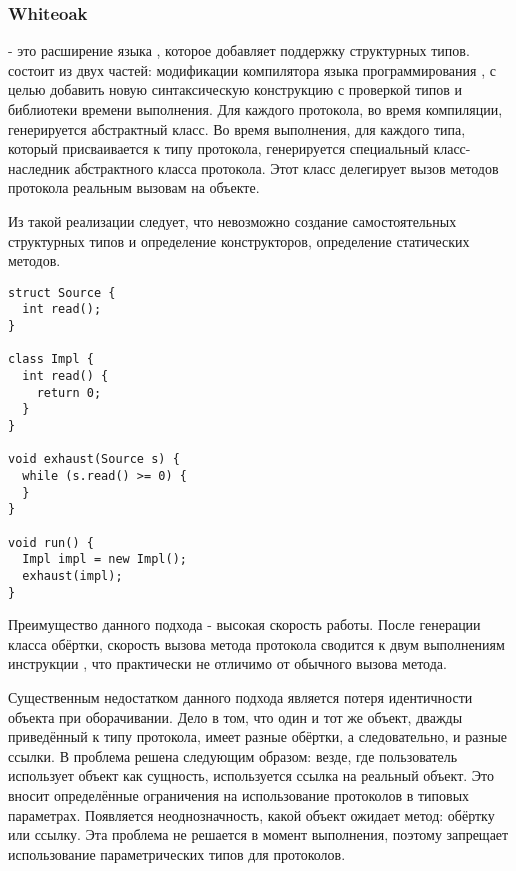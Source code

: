 \subsubsection{Whiteoak}
 - это расширение языка , которое добавляет поддержку структурных типов\cite{whiteoak}.  состоит из двух частей: модификации компилятора языка программирования , с целью добавить новую синтаксическую конструкцию с проверкой типов и библиотеки времени выполнения. Для каждого протокола, во время компиляции, генерируется абстрактный класс. Во время выполнения, для каждого типа, который присваивается к типу протокола, генерируется специальный класс-наследник абстрактного класса протокола. Этот класс делегирует вызов методов протокола реальным вызовам на объекте.

Из такой реализации следует, что невозможно создание самостоятельных структурных типов и определение конструкторов, определение статических методов.

\begin{verbatim}
struct Source {
  int read();
}

class Impl {
  int read() {
    return 0;
  }
}

void exhaust(Source s) {
  while (s.read() >= 0) {
  }
}

void run() {
  Impl impl = new Impl();
  exhaust(impl);
}

\end{verbatim}

Преимущество данного подхода - высокая скорость работы. После генерации класса обёртки, скорость вызова метода протокола сводится к двум выполнениям инструкции , что практически не отличимо от обычного вызова метода.

Существенным недостатком данного подхода является потеря идентичности объекта при оборачивании. Дело в том, что один и тот же объект, дважды приведённый к типу протокола, имеет разные обёртки, а следовательно, и разные ссылки. В  проблема решена следующим образом: везде, где пользователь использует объект как сущность, используется ссылка на реальный объект. Это вносит определённые ограничения на использование протоколов в типовых параметрах. Появляется неоднозначность, какой объект ожидает метод: обёртку или ссылку. Эта проблема не решается в момент выполнения, поэтому  запрещает использование параметрических типов для протоколов.
